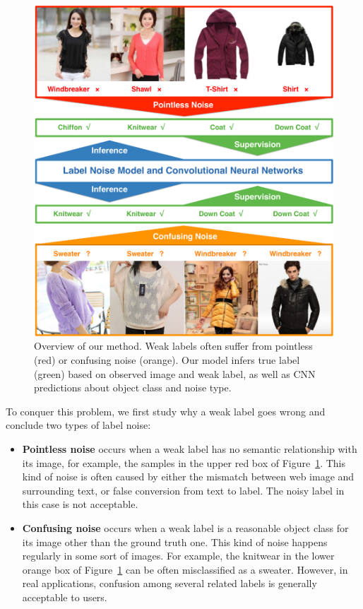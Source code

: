 \documentclass[10pt,twocolumn,letterpaper]{article}
\begin{document}
\begin{figure}[t]
\begin{center}
\includegraphics[width=0.9\linewidth]{figure/overview.pdf}
\end{center}
\caption{Overview of our method. Weak labels often suffer from pointless (red) or confusing noise (orange). Our model infers true label (green) based on observed image and weak label, as well as CNN predictions about object class and noise type.}
\label{fig:overview}
\end{figure}

To conquer this problem, we first study why a weak label goes wrong and conclude two types of label noise:
\begin{itemize}
   \item \textbf{Pointless noise} occurs when a weak label has no semantic relationship with its image, for example, the samples in the upper red box of Figure~\ref{fig:overview}. This kind of noise is often caused by either the mismatch between web image and surrounding text, or false conversion from text to label. The noisy label in this case is not acceptable.
   \item \textbf{Confusing noise} occurs when a weak label is a reasonable object class for its image other than the ground truth one. This kind of noise happens regularly in some sort of images. For example, the knitwear in the lower orange box of Figure~\ref{fig:overview} can be often misclassified as a sweater. However, in real applications, confusion among several related labels is generally acceptable to users.
\end{itemize}
\end{document}
